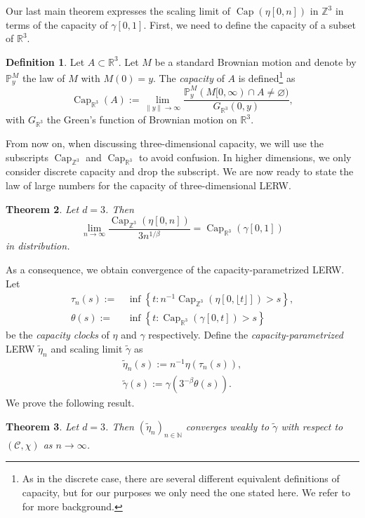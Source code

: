 \documentclass{article}
\DeclareMathOperator{\C}{Cap}
\DeclareMathOperator{\Ca}{Cap}
\newcommand{\R}{\mathbb{R}}
\newcommand{\Z}{\mathbb{Z}}
\newcommand{\N}{\mathbb{N}}
\renewcommand{\P}{\mathbb{P}}
\newcommand{\1}{\mathbf{1}}
\newcommand{\limn}{\lim_{n\rightarrow\infty}}
\newcommand{\Cr}{\C_{\R^3}}
\newtheorem{theorem}{Theorem}
\theoremstyle{definition}
\newtheorem{definition}[theorem]{Definition}
\numberwithin{equation}{section}
\numberwithin{theorem}{section}
\begin{document}
Our last main theorem expresses the scaling limit of $\Ca(\eta[0,n])$ in $\Z^3$ in terms of the capacity of $\gamma[0,1]$. First, we need to define the capacity of a subset of $\R^3$.
\begin{definition}\label{def:capacity-R3}
Let $A\subset\R^3$. Let $M$ be a standard Brownian motion and denote by $\P^M_y$ the law of $M$ with $M(0)=y$. The \emph{capacity} of $A$ is defined\footnote{As in the discrete case, there are several different equivalent definitions of capacity, but for our purposes we only need the one stated here. We refer to \cite{morters2010brownian} for more background.} as
\begin{equation}
    \Ca_{\R^3}(A):=\lim_{\|y\|\rightarrow\infty}\frac{\P_y^M(M[0,\infty)\cap A\neq\varnothing)}{G_{\R^3}(0,y)},
\end{equation}
with $G_{\R^3}$ the Green's function of Brownian motion on $\R^3$.
\end{definition}
From now on, when discussing three-dimensional capacity, we will use the subscripts $\Ca_{\Z^3}$ and $\Ca_{\R^3}$ to avoid confusion. In higher dimensions, we only consider discrete capacity and drop the subscript. We are now ready to state the law of large numbers for the capacity of three-dimensional LERW.
\begin{theorem}\label{th:d3}
Let $d=3$. Then
\begin{equation}
    \limn\frac{\Ca_{\Z^3}(\eta[0,n])}{3n^{1/\beta}}=\Cr(\gamma[0,1])
\end{equation}
in distribution.
\end{theorem}

As a consequence, we obtain convergence of the capacity-parametrized LERW. Let
\begin{equation}\label{eq:def-capacity-clocks}
    \begin{split}
        \tau_n(s):=&\,\inf\left\{t:n^{-1}\Ca_{\Z^3}(\eta[0,\lfloor t\rfloor])> s\right\},\\
        \theta(s):=&\,\inf\left\{t:\Ca_{\R^3}(\gamma[0,t])> s\right\}
    \end{split}
\end{equation}
be the \emph{capacity clocks} of $\eta$ and $\gamma$ respectively. Define the \emph{capacity-parametrized} LERW $\widetilde{\eta}_n$ and scaling limit $\widetilde{\gamma}$ as
\begin{equation}\label{eq:def-capacity-param-proc}
    \begin{split}
        \widetilde{\eta}_n(s):=n^{-1}\eta(\tau_n(s)),\\
        \widetilde{\gamma}(s):=\gamma(3^{-\beta}\theta(s)).
    \end{split}
\end{equation}
We prove the following result.
\begin{theorem}\label{th:scaling-limit-cap-par}
Let $d=3$. Then $(\widetilde{\eta}_n)_{n\in\N}$ converges weakly to $\widetilde{\gamma}$ with respect to $(\mathcal{C},\chi)$ as $n\rightarrow\infty$.
\end{theorem}
\end{document}
